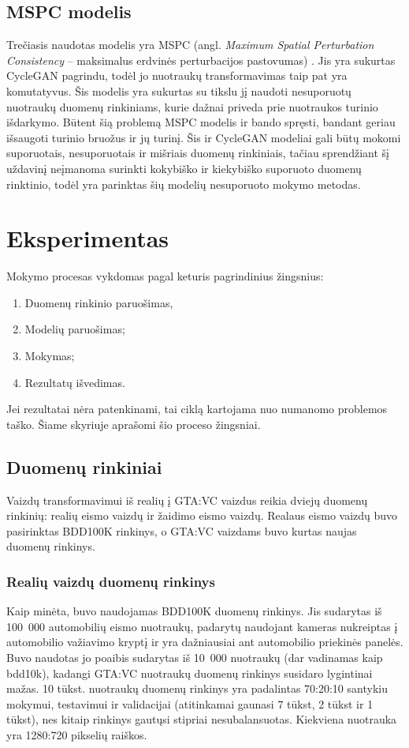 \documentclass{VUMIFPSkursinis}
\begin{document}
    \subsection{MSPC modelis}
        Trečiasis naudotas modelis yra MSPC (angl. \emph{Maximum Spatial Perturbation Consistency} – maksimalus erdvinės perturbacijos pastovumas) \cite{Mspc}. Jis yra sukurtas CycleGAN \cite{CycleGAN2017} pagrindu, todėl jo nuotraukų transformavimas taip pat yra komutatyvus. Šis modelis yra sukurtas su tikslu jį naudoti nesuporuotų nuotraukų duomenų rinkiniams, kurie dažnai priveda prie nuotraukos turinio išdarkymo. Būtent šią problemą MSPC modelis ir bando spręsti, bandant geriau išsaugoti turinio bruožus ir jų turinį. Šis ir CycleGAN modeliai gali būtų mokomi suporuotais, nesuporuotais ir mišriais duomenų rinkiniais, tačiau sprendžiant šį uždavinį neįmanoma surinkti kokybiško ir kiekybiško suporuoto duomenų rinktinio, todėl yra parinktas šių modelių nesuporuoto mokymo metodas.
\section{Eksperimentas}
    Mokymo procesas vykdomas pagal keturis pagrindinius žingsnius: 
    \begin{enumerate}
        \item Duomenų rinkinio paruošimas,
        \item Modelių paruošimas;
        \item Mokymas;
        \item Rezultatų išvedimas.
    \end{enumerate}
    Jei rezultatai nėra patenkinami, tai ciklą kartojama nuo numanomo problemos taško. Šiame skyriuje aprašomi šio proceso žingsniai.
    \subsection{Duomenų rinkiniai}
            Vaizdų transformavimui iš realių į GTA:VC vaizdus reikia dviejų duomenų rinkinių: realių eismo vaizdų ir žaidimo eismo vaizdų. Realaus eismo vaizdų buvo pasirinktas BDD100K\cite{BDD100K}  rinkinys, o GTA:VC vaizdams buvo kurtas naujas duomenų rinkinys. 
        \subsubsection{Realių vaizdų duomenų rinkinys}
            Kaip minėta, buvo naudojamas BDD100K duomenų rinkinys. Jis sudarytas iš 100~000 automobilių eismo nuotraukų, padarytų naudojant kameras nukreiptas į automobilio važiavimo kryptį ir yra dažniausiai ant automobilio priekinės panelės. Buvo naudotas jo poaibis sudarytas iš 10~000 nuotraukų (dar vadinamas kaip bdd10k), kadangi GTA:VC nuotraukų duomenų rinkinys susidaro lygintinai mažas. 10 tūkst. nuotraukų duomenų rinkinys yra padalintas 70:20:10 santykiu mokymui, testavimui ir validacijai (atitinkamai gaunasi 7 tūkst, 2 tūkst ir 1 tūkst), nes kitaip rinkinys gautųsi stipriai nesubalansuotas. Kiekviena nuotrauka yra 1280:720 pikselių raiškos.
            
\end{document}
